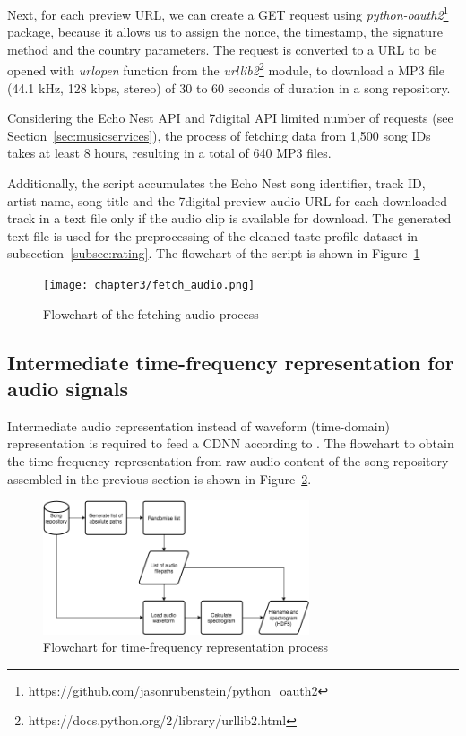 Next, for each preview URL, we can create a GET request using \textit{python-oauth2}\footnote{https://github.com/jasonrubenstein/python\_oauth2} package, because it allows us to assign the nonce, the timestamp, the signature method and the country parameters. The request is converted to a URL to be opened with \textit{urlopen} function from the \textit{urllib2}\footnote{https://docs.python.org/2/library/urllib2.html} module, to download a MP3 file (44.1 kHz, 128 kbps, stereo) of 30 to 60 seconds of duration in a song repository.

Considering the Echo Nest API and 7digital API limited number of requests (see Section~\ref{sec:musicservices}), the process of fetching data from 1,500 song IDs takes at least 8 hours, resulting in a total of 640 MP3 files.

Additionally, the script accumulates the Echo Nest song identifier, track ID, artist name, song title and the 7digital preview audio URL for each downloaded track in a text file only if the audio clip is available for download. The generated text file is used for the preprocessing of the cleaned taste profile dataset in subsection~\ref{subsec:rating}. The flowchart of the script is shown in Figure~\ref{fig:fetchaudio}
\begin{figure}[ht!]
	\centering
	\texttt{[image: chapter3/fetch\_audio.png]}
	\caption{Flowchart of the fetching audio process}
	\label{fig:fetchaudio}
\end{figure}


\subsection{Intermediate time-frequency representation for audio signals}
\label{subsec:spectrogram}
Intermediate audio representation instead of waveform (time-domain) representation is required to feed a CDNN according to \textcite{NIPS2013_5004}. The flowchart to obtain the time-frequency representation from raw audio content of the song repository assembled in the previous section is shown in Figure~\ref{fig:timefrequency}.
\begin{figure}[ht!]
	\centering
	\includegraphics[width=0.7\textwidth]{chapter3/time_frequency.png}
	\caption{Flowchart for time-frequency representation process}
	\label{fig:timefrequency}
\end{figure}

